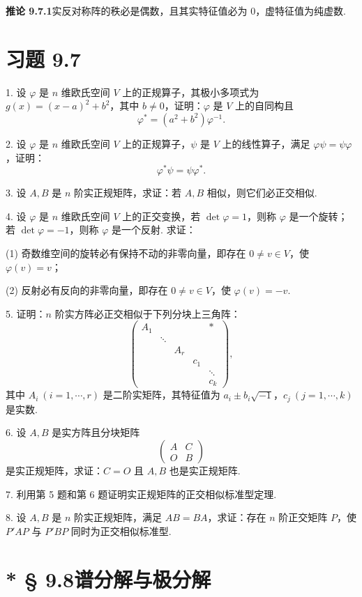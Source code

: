 \documentclass[UTF8, 12pt, fontset=fandol, oneside]{ctexart}
\begin{document}
\noindent\textbf{推论 9.7.1}\quad 实反对称阵的秩必是偶数，且其实特征值必为 $0$，虚特征值为纯虚数.

\section*{习题 9.7}

1. 设 $\varphi$ 是 $n$ 维欧氏空间 $V$ 上的正规算子，其极小多项式为 $g(x)=(x-a)^2+b^2$，其中 $b\ne0$，证明：$\varphi$ 是 $V$ 上的自同构且
\[
  \varphi^*=(a^2+b^2)\varphi^{-1}.
\]

2. 设 $\varphi$ 是 $n$ 维欧氏空间 $V$ 上的正规算子，$\psi$ 是 $V$ 上的线性算子，满足 $\varphi\psi=\psi\varphi$，证明：
\[
  \varphi^*\psi=\psi\varphi^*.
\]

3. 设 $A,B$ 是 $n$ 阶实正规矩阵，求证：若 $A,B$ 相似，则它们必正交相似.

4. 设 $\varphi$ 是 $n$ 维欧氏空间 $V$ 上的正交变换，若 $\det\varphi=1$，则称 $\varphi$ 是一个旋转；若 $\det\varphi=-1$，则称 $\varphi$ 是一个反射. 求证：

(1) 奇数维空间的旋转必有保持不动的非零向量，即存在 $0\ne v\in V$，使 $\varphi(v)=v$；

(2) 反射必有反向的非零向量，即存在 $0\ne v\in V$，使 $\varphi(v)=-v$.

5. 证明：$n$ 阶实方阵必正交相似于下列分块上三角阵：
\[
  \left(\begin{array}{ccccc}
    A_1 & & & & *\\
    & \ddots & & &\\
    & & A_r & &\\
    & & & c_1 &\\
    & & & & \ddots\\
    & & & & c_k
  \end{array}\right),
\]
其中 $A_i\ (i=1,\cdots,r)$ 是二阶实矩阵，其特征值为 $a_i\pm b_i\sqrt{-1}$，$c_j\ (j=1,\cdots,k)$ 是实数.

6. 设 $A,B$ 是实方阵且分块矩阵
\[
  \left(\begin{array}{cc}
    A & C\\
    O & B
  \end{array}\right)
\]
是实正规矩阵，求证：$C=O$ 且 $A,B$ 也是实正规矩阵.

7. 利用第 5 题和第 6 题证明实正规矩阵的正交相似标准型定理.

8. 设 $A,B$ 是 $n$ 阶实正规矩阵，满足 $AB=BA$，求证：存在 $n$ 阶正交矩阵 $P$，使 $P'AP$ 与 $P'BP$ 同时为正交相似标准型.

\section*{* § 9.8\quad 谱分解与极分解}
\end{document}
